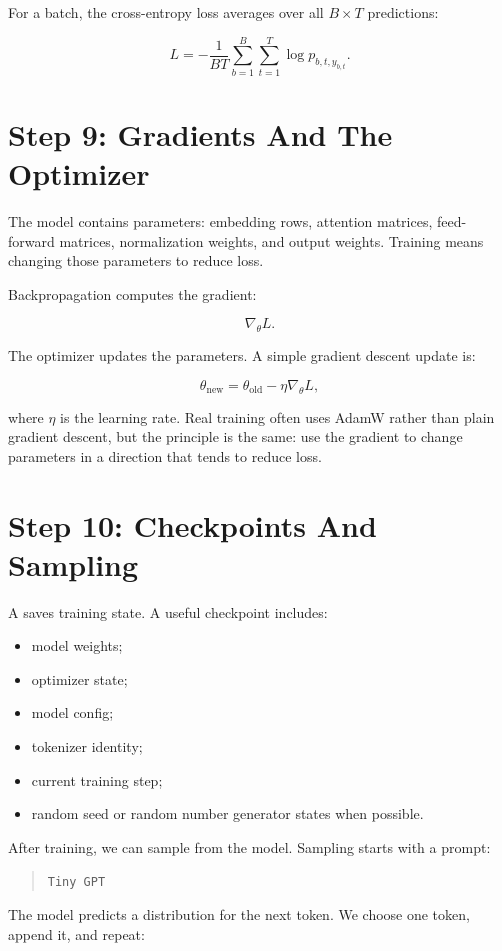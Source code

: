 For a batch, the cross-entropy loss averages over all \(B \times T\) predictions:

\[
L = -\frac{1}{BT}\sum_{b=1}^{B}\sum_{t=1}^{T}\log p_{b,t,y_{b,t}}.
\]

\section{Step 9: Gradients And The Optimizer}

The model contains parameters: embedding rows, attention matrices, feed-forward matrices, normalization weights, and output weights. Training means changing those parameters to reduce loss.

Backpropagation computes the gradient:

\[
\nabla_{\theta} L.
\]

The optimizer updates the parameters. A simple gradient descent update is:

\[
\theta_{\text{new}} = \theta_{\text{old}} - \eta \nabla_{\theta}L,
\]

where \(\eta\) is the learning rate. Real training often uses AdamW rather than plain gradient descent, but the principle is the same: use the gradient to change parameters in a direction that tends to reduce loss.

\section{Step 10: Checkpoints And Sampling}

A  saves training state. A useful checkpoint includes:

\begin{itemize}
  \item model weights;
  \item optimizer state;
  \item model config;
  \item tokenizer identity;
  \item current training step;
  \item random seed or random number generator states when possible.
\end{itemize}

After training, we can sample from the model. Sampling starts with a prompt:

\begin{quote}
\texttt{Tiny GPT}
\end{quote}

The model predicts a distribution for the next token. We choose one token, append it, and repeat:

